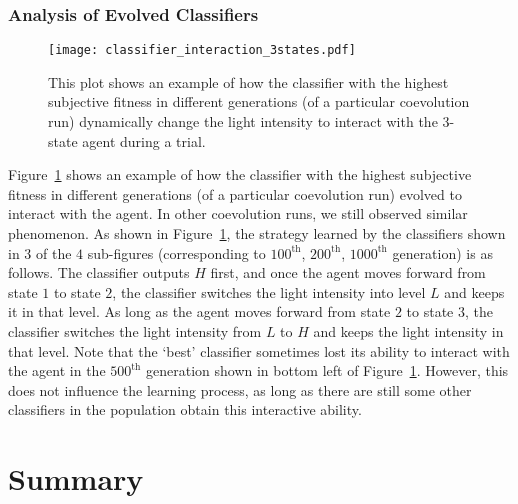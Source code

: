 \subsubsection{Analysis of Evolved Classifiers}
%
\begin{figure}[!t]
\centering
\texttt{[image: classifier\_interaction\_3states.pdf]}
\caption{This plot shows an example of how the classifier with the highest subjective fitness in different generations (of a particular coevolution run) dynamically change the light intensity to interact with the 3-state agent during a trial.}
\label{fig:classifier_interaction_3states}
\end{figure}
%

Figure~\ref{fig:classifier_interaction_3states} shows an example of how the classifier with the highest subjective fitness in different generations (of a particular coevolution run) evolved to interact with the agent. In other coevolution runs, we still observed similar phenomenon. As shown in Figure~\ref{fig:classifier_interaction_3states}, the strategy learned by the classifiers shown in $3$ of the $4$ sub-figures (corresponding to $100^\mathrm{th}$, $200^\mathrm{th}$, $1000^\mathrm{th}$ generation) is as follows. The classifier outputs $H$ first, and once the agent moves forward from state $1$ to state $2$, the classifier switches the light intensity into level $L$ and keeps it in that level. As long as the agent moves forward from state $2$ to state $3$, the classifier switches the light intensity from $L$ to $H$ and keeps the light intensity in that level. Note that the `best' classifier sometimes lost its ability to interact with the agent in the $500^\mathrm{th}$ generation shown in bottom left of Figure~\ref{fig:classifier_interaction_3states}. However, this does not influence the learning process, as long as there are still some other classifiers in the population obtain this interactive ability. 

\section{Summary}\label{sec:summary_interaction}


